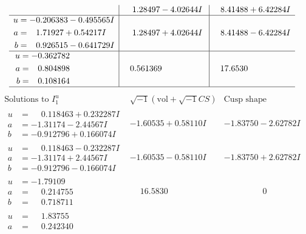 \documentclass[1p]{elsarticle_modified}
\theoremstyle{definition}
\newcommand{\I}{\sqrt{-1}}
\begin{document}
$$\begin{array}{c|c|c}
 & \phantom{-}1.28497 - 4.02644 I & \phantom{-}8.41488 + 6.42284 I \\ \hline\begin{aligned}
u &= -0.206383 - 0.495565 I \\
a &= \phantom{-}1.71927 + 0.54217 I \\
b &= \phantom{-}0.926515 - 0.641729 I\end{aligned}
 & \phantom{-}1.28497 + 4.02644 I & \phantom{-}8.41488 - 6.42284 I \\ \hline\begin{aligned}
u &= -0.362782\phantom{ +0.000000I} \\
a &= \phantom{-}0.804898\phantom{ +0.000000I} \\
b &= \phantom{-}0.108164\phantom{ +0.000000I}\end{aligned}
 & \phantom{-}0.561369\phantom{ +0.000000I} & \phantom{-}17.6530\phantom{ +0.000000I}\\
 \hline 
 \end{array}$$\newpage$$\begin{array}{c|c|c}  
\text{Solutions to }I^u_{1}& \I (\text{vol} + \sqrt{-1}CS) & \text{Cusp shape}\\
 \hline 
\begin{aligned}
u &= \phantom{-}0.118463 + 0.232287 I \\
a &= -1.31174 - 2.44567 I \\
b &= -0.912796 + 0.166074 I\end{aligned}
 & -1.60535 + 0.58110 I & -1.83750 - 2.62782 I \\ \hline\begin{aligned}
u &= \phantom{-}0.118463 - 0.232287 I \\
a &= -1.31174 + 2.44567 I \\
b &= -0.912796 - 0.166074 I\end{aligned}
 & -1.60535 - 0.58110 I & -1.83750 + 2.62782 I \\ \hline\begin{aligned}
u &= -1.79109\phantom{ +0.000000I} \\
a &= \phantom{-}0.214755\phantom{ +0.000000I} \\
b &= \phantom{-}0.718711\phantom{ +0.000000I}\end{aligned}
 & \phantom{-}16.5830\phantom{ +0.000000I} & \phantom{-0.000000 } 0 \\ \hline\begin{aligned}
u &= \phantom{-}1.83755\phantom{ +0.000000I} \\
a &= \phantom{-}0.242340\phantom{ +0.000000I} \\

\end{aligned}
\end{array}$$
\end{document}
